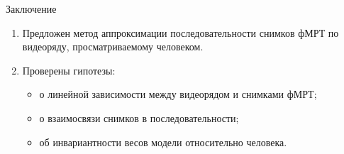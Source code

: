 \documentclass[10pt]{beamer}
\begin{document}
\begin{frame}{Заключение}
    \begin{enumerate}
        \item Предложен метод аппроксимации последовательности снимков фМРТ по видеоряду,
              просматриваемому человеком.
        \item Проверены гипотезы:
            \begin{itemize}
                \item о линейной зависимости между видеорядом и снимками фМРТ;
                \item о взаимосвязи снимков в последовательности;
                \item об инвариантности весов модели относительно человека.
            \end{itemize}
    \end{enumerate}
\end{frame}
\end{document}
